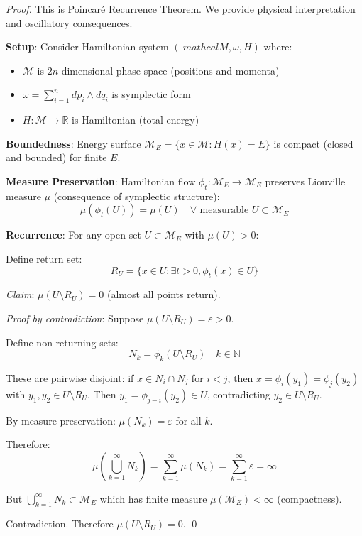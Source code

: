 \documentclass[11pt,onecolumn]{article}
\begin{document}
\begin{proof}
This is Poincar\'e Recurrence Theorem. We provide physical interpretation and oscillatory consequences.

\textbf{Setup}: Consider Hamiltonian system $(\ mathcal{M}, \omega, H)$ where:
\begin{itemize}
\item $\mathcal{M}$ is $2n$-dimensional phase space (positions and momenta)
\item $\omega = \sum_{i=1}^{n} dp_i \wedge dq_i$ is symplectic form
\item $H: \mathcal{M} \to \mathbb{R}$ is Hamiltonian (total energy)
\end{itemize}

\textbf{Boundedness}: Energy surface $\mathcal{M}_E = \{x \in \mathcal{M} : H(x) = E\}$ is compact (closed and bounded) for finite $E$.

\textbf{Measure Preservation}: Hamiltonian flow $\phi_t: \mathcal{M}_E \to \mathcal{M}_E$ preserves Liouville measure $\mu$ (consequence of symplectic structure):
\begin{equation}
\mu(\phi_t(U)) = \mu(U) \quad \forall \text{ measurable } U \subset \mathcal{M}_E
\end{equation}

\textbf{Recurrence}: For any open set $U \subset \mathcal{M}_E$ with $\mu(U) > 0$:

Define return set:
\begin{equation}
R_U = \{x \in U : \exists t > 0, \phi_t(x) \in U\}
\end{equation}

\textit{Claim}: $\mu(U \setminus R_U) = 0$ (almost all points return).

\textit{Proof by contradiction}: Suppose $\mu(U \setminus R_U) = \varepsilon > 0$.

Define non-returning sets:
\begin{equation}
N_k = \phi_k(U \setminus R_U) \quad k \in \mathbb{N}
\end{equation}

These are pairwise disjoint: if $x \in N_i \cap N_j$ for $i < j$, then $x = \phi_i(y_1) = \phi_j(y_2)$ with $y_1, y_2 \in U \setminus R_U$. Then $y_1 = \phi_{j-i}(y_2) \in U$, contradicting $y_2 \in U \setminus R_U$.

By measure preservation: $\mu(N_k) = \varepsilon$ for all $k$.

Therefore:
\begin{equation}
\mu\left(\bigcup_{k=1}^{\infty} N_k\right) = \sum_{k=1}^{\infty} \mu(N_k) = \sum_{k=1}^{\infty} \varepsilon = \infty
\end{equation}

But $\bigcup_{k=1}^{\infty} N_k \subset \mathcal{M}_E$ which has finite measure $\mu(\mathcal{M}_E) < \infty$ (compactness).

Contradiction. Therefore $\mu(U \setminus R_U) = 0$. \qed
\end{proof}
\end{document}
